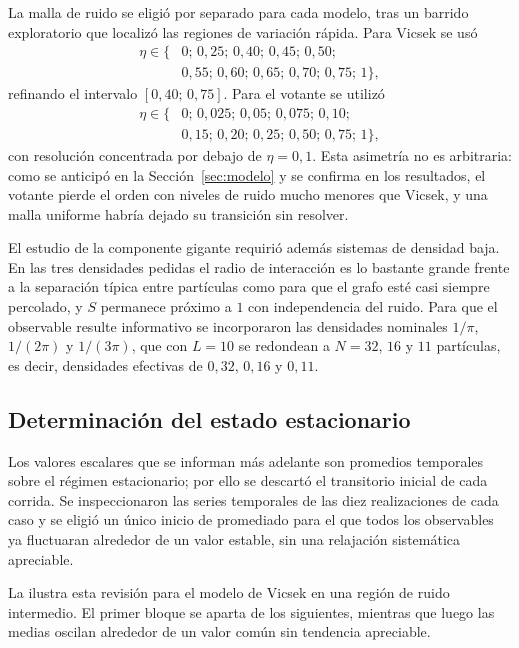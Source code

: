 \documentclass[11pt,a4paper]{article}
\begin{document}
La malla de ruido se eligió por separado para cada modelo, tras un barrido
exploratorio que localizó las regiones de variación rápida. Para Vicsek se usó
\[
\begin{aligned}
\eta \in \{&0;\,0{,}25;\,0{,}40;\,0{,}45;\,0{,}50;\\
             &0{,}55;\,0{,}60;\,0{,}65;\,0{,}70;\,0{,}75;\,1\},
\end{aligned}
\]
refinando el intervalo $[0{,}40;\,0{,}75]$. Para el votante se utilizó
\[
\begin{aligned}
\eta \in \{&0;\,0{,}025;\,0{,}05;\,0{,}075;\,0{,}10;\\
             &0{,}15;\,0{,}20;\,0{,}25;\,0{,}50;\,0{,}75;\,1\},
\end{aligned}
\]
con resolución concentrada por debajo de $\eta = 0{,}1$. Esta asimetría no es
arbitraria: como se anticipó en la Sección~\ref{sec:modelo} y se confirma en los
resultados, el votante pierde el orden con niveles de ruido mucho menores que
Vicsek, y una malla uniforme habría dejado su transición sin resolver.

El estudio de la componente gigante requirió además sistemas de densidad baja. En
las tres densidades pedidas el radio de interacción es lo bastante grande frente
a la separación típica entre partículas como para que el grafo esté casi siempre
percolado, y $S$ permanece próximo a $1$ con independencia del ruido. Para que el
observable resulte informativo se incorporaron las densidades nominales
$1/\pi$, $1/(2\pi)$ y $1/(3\pi)$, que con $L = 10$ se redondean a $N = 32$, $16$
y $11$ partículas, es decir, densidades efectivas de $0{,}32$, $0{,}16$ y $0{,}11$.

\subsection{Determinación del estado estacionario}
\label{sec:estacionario}

Los valores escalares que se informan más adelante son promedios temporales sobre
el régimen estacionario; por ello se descartó el transitorio inicial de cada
corrida. Se inspeccionaron las series temporales de las diez realizaciones de cada
caso y se eligió un único inicio de promediado para el que todos los observables
ya fluctuaran alrededor de un valor estable, sin una relajación sistemática
apreciable.

La  ilustra esta revisión para el modelo de Vicsek en una
región de ruido intermedio. El primer bloque se aparta de los siguientes, mientras
que luego las medias oscilan alrededor de un valor común sin tendencia apreciable.
\end{document}
